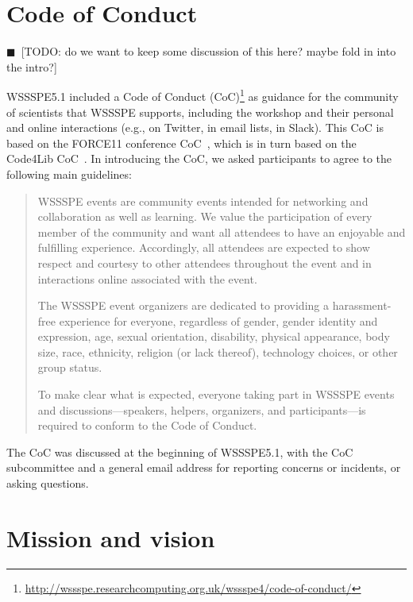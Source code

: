 \documentclass[11pt, oneside]{amsart}
\makeatletter
\newcommand\footnoteref[1]{\protected@xdef\@thefnmark{\ref{#1}}\@footnotemark}
\newcommand{\todo}[1]{{\color{blue}$\blacksquare$~\textsf{[TODO: #1]}}}
\makeatother
\begin{document}
\section{Code of Conduct}\label{sec:CoC}

\todo{do we want to keep some discussion of this here?  maybe fold in into the intro?}

WSSSPE5.1 included a Code of Conduct (CoC)\footnote{\label{footnote:CoC}\url{http://wssspe.researchcomputing.org.uk/wssspe4/code-of-conduct/}} as guidance for the community of scientists that WSSSPE
supports, including the workshop and their personal and online interactions (e.g., on
Twitter, in email lists, in Slack). This CoC is based on the
FORCE11 conference CoC~\cite{FORCE11:CoC}, which is in turn based on the Code4Lib
CoC~\cite{Code4Lib:CoC}.
In introducing the CoC, we asked participants to agree to the following main guidelines:
\begin{quote}
    WSSSPE events are community events intended for networking and collaboration
    as well as learning. We value the participation of every member of the
    community and want all attendees to have an enjoyable and fulfilling
    experience. Accordingly, all attendees are expected to show respect and
    courtesy to other attendees throughout the event and in interactions online
    associated with the event.

    The WSSSPE event organizers are dedicated to providing a harassment-free
    experience for everyone, regardless of gender, gender identity and
    expression, age, sexual orientation, disability, physical appearance,
    body size, race, ethnicity, religion (or lack thereof), technology choices,
    or other group status.

    To make clear what is expected, everyone taking part in WSSSPE events and
    discussions---speakers, helpers, organizers, and participants---is required
    to conform to the Code of Conduct\footnoteref{footnote:CoC}.

 \end{quote}

The CoC was discussed at the beginning of WSSSPE5.1, with the CoC subcommittee
and a general email address for reporting concerns or incidents, or
asking questions. 

\section{Mission and vision}\label{sec:mission}
\end{document}
